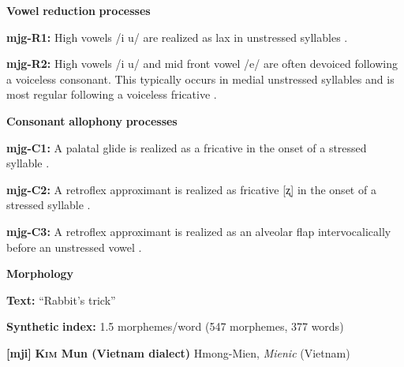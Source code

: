 \documentclass[output=paper]{langsci/langscibook}
\begin{document}
\begin{styleBody}
\textbf{Vowel} \textbf{reduction} \textbf{processes}
\end{styleBody}

\begin{styleBody}
\textbf{mjg-R1:} High vowels /i u/ are realized as lax in unstressed syllables \citep[35]{Slater2003}.
\end{styleBody}

\begin{styleBody}
\textbf{mjg-R2:} High vowels /i u/ and mid front vowel /e/ are often devoiced following a voiceless consonant. This typically occurs in medial unstressed syllables and is most regular following a voiceless fricative \citep[36]{Slater2003}.
\end{styleBody}

\begin{styleBody}
\textbf{Consonant} \textbf{allophony} \textbf{processes}
\end{styleBody}

\begin{styleBody}
\textbf{mjg-C1:} A palatal glide is realized as a fricative in the onset of a stressed syllable \citep[31-2]{Slater2003}.
\end{styleBody}

\begin{styleBody}
\textbf{mjg-C2:} A retroflex approximant is realized as fricative [ʐ] in the onset of a stressed syllable \citep[30]{Slater2003}.
\end{styleBody}

\begin{styleBody}
\textbf{mjg-C3:} A retroflex approximant is realized as an alveolar flap intervocalically before an unstressed vowel \citep[31]{Slater2003}.
\end{styleBody}

\begin{styleBody}
\textbf{Morphology}
\end{styleBody}

\begin{styleBody}
\textbf{Text:} “Rabbit’s trick” \citep[343-350]{Slater2003}
\end{styleBody}

\begin{styleBody}
\textbf{Synthetic} \textbf{index:} 1.5 morphemes/word (547 morphemes, 377 words)
\end{styleBody}

\begin{styleBody}
\textbf{[mji]}   \textbf{\textsc{Kim} \textbf{Mun} \textbf{(Vietnam} \textbf{dialect)}}  Hmong-Mien, \textit{Mienic} (Vietnam)
\end{styleBody}
\end{document}
